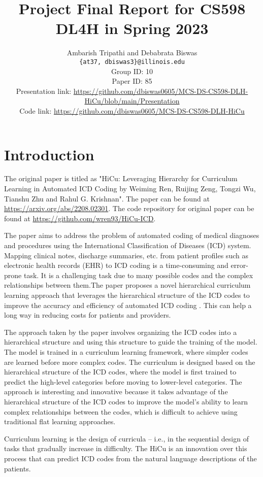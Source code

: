 \documentclass[11pt,a4paper]{article}
\title{Project Final Report for CS598 DL4H in Spring 2023}
\author{Ambarish Tripathi and Debabrata Biswas \\
  \texttt{\{at37, dbiswas3\}@illinois.edu}
  \\[2em]
  Group ID: 10\\
  Paper ID: 85\\
  Presentation link: \url{https://github.com/dbiswas0605/MCS-DS-CS598-DLH-HiCu/blob/main/Presentation}\\
  Code link: \url{https://github.com/dbiswas0605/MCS-DS-CS598-DLH-HiCu}}
\begin{document}
\maketitle


\section{Introduction}
The original paper \cite{ren2022hicu} is titled as "HiCu: Leveraging Hierarchy for Curriculum Learning in Automated ICD Coding by Weiming Ren, Ruijing Zeng, Tongzi Wu, Tianshu Zhu and Rahul G. Krishnan". The paper can be found at \url{https://arxiv.org/abs/2208.02301}. The code repository for original paper can be found at \url{https://github.com/wren93/HiCu-ICD}.

The paper aims to address the problem of automated coding of medical diagnoses and procedures using the International Classification of Diseases (ICD) system. Mapping clinical notes, discharge summaries, etc. from patient profiles such as electronic health records (EHR) to ICD coding is a time-consuming and error-prone task. It is a challenging task due to many possible codes and the complex relationships between them.The paper proposes a novel hierarchical curriculum learning approach that leverages the hierarchical structure of the ICD codes to improve the accuracy and efficiency of automated ICD coding \cite{koopman2015automatic} \cite{shi2017towards}. This can help a long way in reducing costs for patients and providers.

The approach taken by the paper involves organizing the ICD codes into a hierarchical structure and using this structure to guide the training of the model. The model is trained in a curriculum learning framework, where simpler codes are learned before more complex codes. The curriculum is designed based on the hierarchical structure of the ICD codes, where the model is first trained to predict the high-level categories before moving to lower-level categories. The approach is interesting and innovative because it takes advantage of the hierarchical structure of the ICD codes to improve the model's ability to learn complex relationships between the codes, which is difficult to achieve using traditional flat learning approaches.

Curriculum learning is the design of curricula – i.e., in the sequential design of tasks that gradually increase in difficulty. The HiCu is an innovation over this process that can predict ICD codes from the natural language descriptions of the patients.
\end{document}
